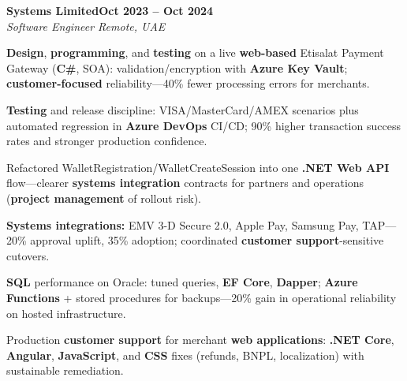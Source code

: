 \documentclass[letterpaper,10pt]{article}
\newcommand{\headingBf}[2]{
  \hspace{10pt}\textbf{#1}\hfill\textbf{#2}\\
}
\newcommand{\headingIt}[2]{
  \hspace{10pt}\textit{#1}\hfill\textit{#2}\\
}
\newenvironment{resume_list}{
  \vspace{-7pt}
  \begin{itemize}[itemsep=-2px, parsep=1pt, leftmargin=30pt]
}{
  \end{itemize}
}
\begin{document}
\headingBf{Systems Limited}{Oct 2023 -- Oct 2024}
\headingIt{Software Engineer \hfill Remote, UAE}{}
\begin{resume_list}
    \item \textbf{Design}, \textbf{programming}, and \textbf{testing} on a live \textbf{web-based} Etisalat Payment Gateway (\textbf{C\#}, SOA): validation/encryption with \textbf{Azure Key Vault}; \textbf{customer-focused} reliability---40\% fewer processing errors for merchants.
    \item \textbf{Testing} and release discipline: VISA/MasterCard/AMEX scenarios plus automated regression in \textbf{Azure DevOps} CI/CD; 90\% higher transaction success rates and stronger production confidence.
    \item Refactored WalletRegistration/WalletCreateSession into one \textbf{.NET Web API} flow---clearer \textbf{systems integration} contracts for partners and operations (\textbf{project management} of rollout risk).
    \item \textbf{Systems integrations:} EMV\textregistered{} 3-D Secure 2.0, Apple Pay, Samsung Pay, TAP---20\% approval uplift, 35\% adoption; coordinated \textbf{customer support}-sensitive cutovers.
    \item \textbf{SQL} performance on Oracle: tuned queries, \textbf{EF Core}, \textbf{Dapper}; \textbf{Azure Functions} + stored procedures for backups---20\% gain in operational reliability on hosted infrastructure.
    \item Production \textbf{customer support} for merchant \textbf{web applications}: \textbf{.NET Core}, \textbf{Angular}, \textbf{JavaScript}, and \textbf{CSS} fixes (refunds, BNPL, localization) with sustainable remediation.
\end{resume_list}
\end{document}
